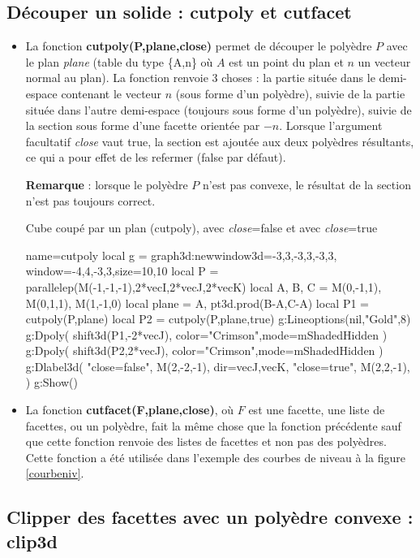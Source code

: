 \subsection{Découper un solide : cutpoly et cutfacet}

\begin{itemize}
    \item La fonction \textbf{cutpoly(P,plane,close)} permet de découper le polyèdre $P$ avec le plan \emph{plane} (table du type \{A,n\} où $A$ est un point du plan et $n$ un vecteur normal au plan). La fonction renvoie 3 choses : la partie située dans le demi-espace contenant le vecteur $n$ (sous forme d'un polyèdre), suivie de la partie située dans l'autre demi-espace (toujours sous forme d'un polyèdre), suivie de la section sous forme d'une facette orientée par $-n$. Lorsque l'argument facultatif \emph{close} vaut true, la section est ajoutée aux deux polyèdres résultants, ce qui a pour effet de les refermer (false par défaut).\par
    \textbf{Remarque} : lorsque le polyèdre $P$ n'est pas convexe, le résultat de la section n'est pas toujours correct.

\begin{demo}{Cube coupé par un plan (cutpoly), avec \emph{close}=false et avec \emph{close}=true}
\begin{luadraw}{name=cutpoly}
local g = graph3d:new{window3d={-3,3,-3,3,-3,3}, window={-4,4,-3,3},size={10,10}}
local P = parallelep(M(-1,-1,-1),2*vecI,2*vecJ,2*vecK)
local A, B, C = M(0,-1,1), M(0,1,1), M(1,-1,0)
local plane = {A, pt3d.prod(B-A,C-A)}
local P1 = cutpoly(P,plane)
local P2 = cutpoly(P,plane,true)
g:Lineoptions(nil,"Gold",8)
g:Dpoly( shift3d(P1,-2*vecJ), {color="Crimson",mode=mShadedHidden} )
g:Dpoly( shift3d(P2,2*vecJ), {color="Crimson",mode=mShadedHidden} )
g:Dlabel3d(
    "close=false", M(2,-2,-1), {dir={vecJ,vecK}},
    "close=true", M(2,2,-1), {}
    )
g:Show()            
\end{luadraw}
\end{demo}

     \item La fonction \textbf{cutfacet(F,plane,close)}, où $F$ est une facette, une liste de facettes, ou un polyèdre, fait la même chose que la fonction précédente sauf que cette fonction renvoie des listes de facettes et non pas des polyèdres. Cette fonction a été utilisée dans l'exemple des courbes de niveau à la figure \ref{courbeniv}.
\end{itemize}

\subsection{Clipper des facettes avec un polyèdre convexe : clip3d}

